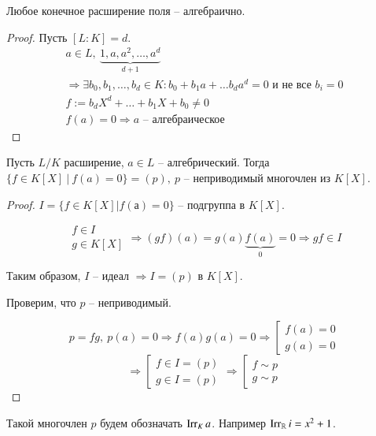 \documentclass[main]{subfiles}
\begin{document}
\begin{proposition}
    Любое конечное расширение поля -- алгебраично.
\end{proposition}

\begin{proof}
    Пусть $[L:K] = d$.
    \begin{gather*}
        a \in L, \ \underbrace{1, a, a^2, \ldots, a^d}_{d+1} \\
        \Rightarrow \exists b_0, b_1, \ldots, b_d \in K : b_0 + b_1a + \ldots b_da^d = 0 \text{ и не все } b_i = 0\\
        f:= b_dX^d + \ldots + b_1 X + b_0 \ne 0 \\
        f(a) = 0 \Rightarrow a \text{ -- алгебраическое }
    \end{gather*}
\end{proof}

\begin{proposition}
    Пусть $L / K$ расширение, $a \in L$ -- алгебрический. Тогда $ \{ f \in K[X] \ | \  f(a) = 0 \} = (p), \ 
    p$ -- неприводимый многочлен из $K[X]$.
\end{proposition}

\begin{proof}
    $ I = \{ f \in K[X] | f(а) = 0 \} \text{ -- подгруппа в } K[X]$.

    \[\left.
    \begin{gathered}
        f \in I \\
        g \in K[X]
    \end{gathered} \right. \Rightarrow (gf)(a) = g(a)\underbrace{f(a)}_{0} = 0 \Rightarrow gf \in I \]

    Таким образом, $I$ -- идеал $\Rightarrow I = (p)$ в $K[X]$. 

    Проверим, что $p$ -- неприводимый.
  
    \[p = fg, \ 
    p(a) = 0 \Rightarrow f(a)g(a) = 0 \Rightarrow \left[ \begin{gathered}
        f(a) = 0 \\
        g(a) = 0
    \end{gathered} \right. \]
    \[ \Rightarrow \left[ \begin{gathered}
        f \in I = (p) \\
        g \in I = (p)
    \end{gathered} \right. \Rightarrow \left[ \begin{gathered}
        f \sim p \\
        g \sim p
    \end{gathered} \right. \]
\end{proof}
Такой многочлен $p$ будем обозначать $\operatorname{Irr}_K a$. Например $\operatorname{Irr}_{\mathbb{R}} i = x^2 + 1$. \\
\end{document}
